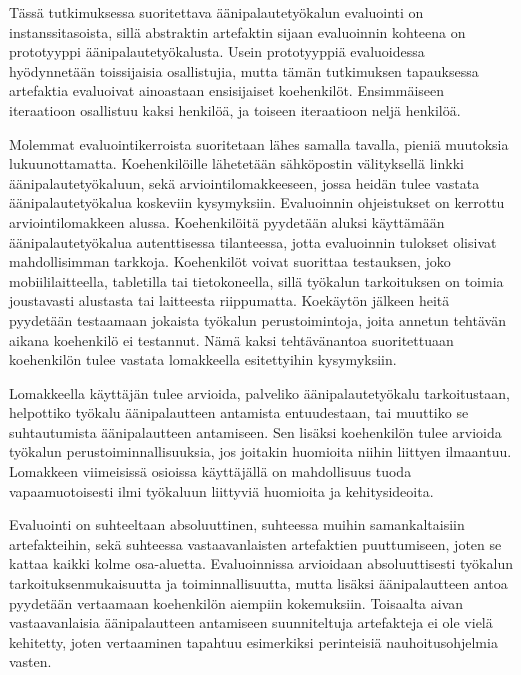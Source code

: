 \documentclass[utf8]{gradu3}
\begin{document}
Tässä tutkimuksessa suoritettava äänipalautetyökalun evaluointi on instanssitasoista, sillä abstraktin artefaktin sijaan evaluoinnin kohteena on prototyyppi äänipalautetyökalusta. Usein prototyyppiä evaluoidessa hyödynnetään toissijaisia osallistujia, mutta tämän tutkimuksen tapauksessa artefaktia evaluoivat ainoastaan ensisijaiset koehenkilöt. Ensimmäiseen iteraatioon osallistuu kaksi henkilöä, ja toiseen iteraatioon neljä henkilöä.

Molemmat evaluointikerroista suoritetaan lähes samalla tavalla, pieniä muutoksia lukuunottamatta. Koehenkilöille lähetetään sähköpostin välityksellä linkki äänipalautetyökaluun, sekä arviointilomakkeeseen, jossa heidän tulee vastata äänipalautetyökalua koskeviin kysymyksiin. Evaluoinnin ohjeistukset on kerrottu arviointilomakkeen alussa. Koehenkilöitä pyydetään aluksi käyttämään äänipalautetyökalua autenttisessa tilanteessa, jotta evaluoinnin tulokset olisivat mahdollisimman tarkkoja. Koehenkilöt voivat suorittaa testauksen, joko mobiililaitteella, tabletilla tai tietokoneella, sillä työkalun tarkoituksen on toimia joustavasti alustasta tai laitteesta riippumatta. Koekäytön jälkeen heitä pyydetään testaamaan jokaista työkalun perustoimintoja, joita annetun tehtävän aikana koehenkilö ei testannut. Nämä kaksi tehtävänantoa suoritettuaan koehenkilön tulee vastata lomakkeella esitettyihin kysymyksiin. 

Lomakkeella käyttäjän tulee arvioida, palveliko äänipalautetyökalu tarkoitustaan, helpottiko työkalu äänipalautteen antamista entuudestaan, tai muuttiko se suhtautumista äänipalautteen antamiseen. Sen lisäksi koehenkilön tulee arvioida työkalun perustoiminnallisuuksia, jos joitakin huomioita niihin liittyen ilmaantuu. Lomakkeen viimeisissä osioissa käyttäjällä on mahdollisuus tuoda vapaamuotoisesti ilmi työkaluun liittyviä huomioita ja kehitysideoita.

Evaluointi on suhteeltaan absoluuttinen, suhteessa muihin samankaltaisiin artefakteihin, sekä suhteessa vastaavanlaisten artefaktien puuttumiseen, joten se kattaa kaikki kolme osa-aluetta. Evaluoinnissa arvioidaan absoluuttisesti työkalun tarkoituksenmukaisuutta ja toiminnallisuutta, mutta lisäksi äänipalautteen antoa pyydetään vertaamaan koehenkilön aiempiin kokemuksiin. Toisaalta aivan vastaavanlaisia äänipalautteen antamiseen suunniteltuja artefakteja ei ole vielä kehitetty, joten vertaaminen tapahtuu esimerkiksi perinteisiä nauhoitusohjelmia vasten.
\end{document}
